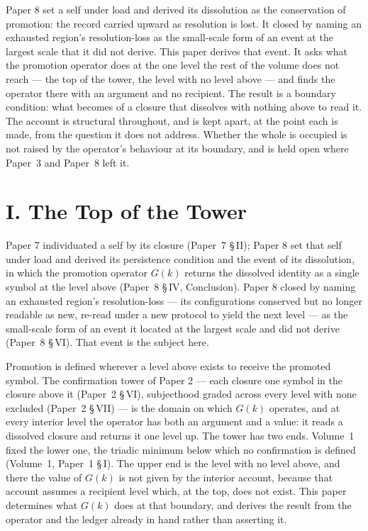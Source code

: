 \documentclass[11pt,oneside]{report}
\theoremstyle{definition}
\theoremstyle{remark}
\begin{document}
Paper 8 set a self under load and derived its dissolution as the conservation of promotion: the
record carried upward as resolution is lost. It closed by naming an exhausted region's
resolution-loss as the small-scale form of an event at the largest scale that it did not derive.
This paper derives that event. It asks what the promotion operator does at the one level the rest of
the volume does not reach --- the top of the tower, the level with no level above --- and finds the
operator there with an argument and no recipient. The result is a boundary condition: what becomes of
a closure that dissolves with nothing above to read it. The account is structural throughout, and is
kept apart, at the point each is made, from the question it does not address. Whether the whole is
occupied is not raised by the operator's behaviour at its boundary, and is held open where Paper~3
and Paper~8 left it.

\section*{I. The Top of the Tower}

Paper 7 individuated a self by its closure (Paper~7 \S\,II); Paper 8 set that self
under load and derived its persistence condition and the event of its dissolution,
in which the promotion operator \ensuremath{G(k)} returns the dissolved identity as a
single symbol at the level above (Paper~8 \S\,IV, Conclusion). Paper 8 closed by
naming an exhausted region's resolution-loss --- its configurations conserved but no
longer readable as new, re-read under a new protocol to yield the next level --- as
the small-scale form of an event it located at the largest scale and did not derive
(Paper~8 \S\,VI). That event is the subject here.

Promotion is defined wherever a level above exists to receive the promoted symbol.
The confirmation tower of Paper 2 --- each closure one symbol in the closure above it
(Paper~2 \S\,VI), subjecthood graded across every level with none excluded
(Paper~2 \S\,VII) --- is the domain on which \ensuremath{G(k)} operates, and at every
interior level the operator has both an argument and a value: it reads a dissolved
closure and returns it one level up. The tower has two ends. Volume~1 fixed the lower
one, the triadic minimum below which no confirmation is defined (Volume~1, Paper~1
\S\,I). The upper end is the level with no level above, and there the value of
\ensuremath{G(k)} is not given by the interior account, because that account assumes a
recipient level which, at the top, does not exist. This paper determines what
\ensuremath{G(k)} does at that boundary, and derives the result from the operator and
the ledger already in hand rather than asserting it.
\end{document}
